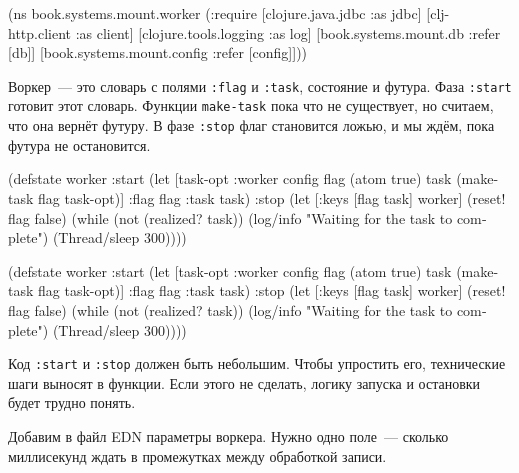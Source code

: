 \else

\begin{english}
  \begin{clojure}
(ns book.systems.mount.worker
  (:require
   [clojure.java.jdbc :as jdbc]
   [clj-http.client :as client]
   [clojure.tools.logging :as log]
   [book.systems.mount.db :refer [db]]
   [book.systems.mount.config :refer [config]]))
  \end{clojure}
\end{english}

\fi

Воркер~--- это словарь с полями \verb|:flag| и \verb|:task|, состояние и
футура. Фаза \verb|:start| готовит этот словарь. Функции \verb|make-task|
пока что не существует, но считаем, что она вернёт футуру. В фазе \verb|:stop|
флаг становится ложью, и мы ждём, пока футура не остановится.


\ifx\DEVICETYPE\MOBILE

\begin{english}
  \begin{clojure}
(defstate worker
  :start
  (let [{task-opt :worker} config
        flag (atom true)
        task (make-task flag task-opt)]
    {:flag flag :task task})
  :stop
  (let [{:keys [flag task]} worker]
    (reset! flag false)
    (while (not (realized? task))
      (log/info
      "Waiting for the task
                to complete")
      (Thread/sleep 300))))
  \end{clojure}
\end{english}

\else

\begin{english}
  \begin{clojure}
(defstate worker
  :start
  (let [{task-opt :worker} config
        flag (atom true)
        task (make-task flag task-opt)]
    {:flag flag :task task})
  :stop
  (let [{:keys [flag task]} worker]
    (reset! flag false)
    (while (not (realized? task))
      (log/info "Waiting for the task to complete")
      (Thread/sleep 300))))
  \end{clojure}
\end{english}

\fi

Код \verb|:start| и \verb|:stop| должен быть небольшим. Чтобы упростить его,
технические шаги выносят в функции. Если этого не сделать, логику запуска и
остановки будет трудно понять.

Добавим в файл EDN параметры воркера. Нужно одно поле~--- сколько миллисекунд
ждать в промежутках между обработкой записи.

